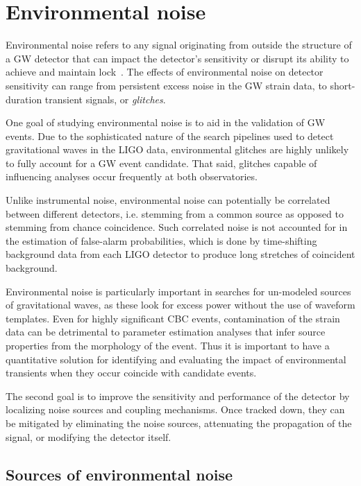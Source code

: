\chapter{Environmental noise}

Environmental noise refers to any signal originating from outside the structure of a \ac{GW} detector that can impact the detector's sensitivity or disrupt its ability to achieve and maintain lock~\citep{Effler_2015,Nguyen_2021}.
The effects of environmental noise on detector sensitivity can range from persistent excess noise in the \ac{GW} strain data, to short-duration transient signals, or \textit{glitches}.

One goal of studying environmental noise is to aid in the validation of \ac{GW} events.
Due to the sophisticated nature of the search pipelines used to detect gravitational waves in the \ac{LIGO} data, environmental glitches are highly unlikely to fully account for a \ac{GW} event candidate.
That said, glitches capable of influencing analyses occur frequently at both observatories.

Unlike instrumental noise, environmental noise can potentially be correlated between different detectors, i.e. stemming from a common source as opposed to stemming from chance coincidence.
Such correlated noise is not accounted for in the estimation of false-alarm probabilities, which is done by time-shifting background data from each \ac{LIGO} detector to produce long stretches of coincident background.

Environmental noise is particularly important in searches for un-modeled sources of gravitational waves, as these look for excess power without the use of waveform templates.
Even for highly significant \ac{CBC} events, contamination of the strain data can be detrimental to parameter estimation analyses that infer source properties from the morphology of the event.
Thus it is important to have a quantitative solution for identifying and evaluating the impact of environmental transients when they occur coincide with candidate events.

The second goal is to improve the sensitivity and performance of the detector by localizing noise sources and coupling mechanisms. Once tracked down, they can be mitigated by eliminating the noise sources, attenuating the propagation of the signal, or modifying the detector itself.

\section{Sources of environmental noise}

